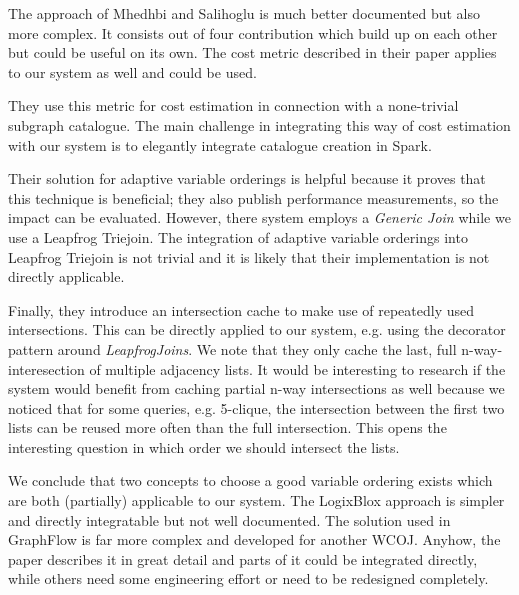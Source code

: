 The approach of Mhedhbi and Salihoglu is much better documented but also more complex.
It consists out of four contribution which build up on each other but could be useful on its own.
The cost metric described in their paper applies to our system as well and could be used.

They use this metric for cost estimation in connection with a none-trivial subgraph catalogue.
The main challenge in integrating this way of cost estimation with our system is to elegantly integrate catalogue creation in Spark.

Their solution for adaptive variable orderings is helpful because it proves that this technique is beneficial;
they also publish performance measurements, so the impact can be evaluated.
However, there system employs a \textit{Generic Join} while we use a Leapfrog Triejoin.
The integration of adaptive variable orderings into Leapfrog Triejoin is not trivial and it is likely that their implementation is not
directly applicable.

Finally, they introduce an intersection cache to make use of repeatedly used intersections.
This can be directly applied to our system, e.g. using the decorator pattern around \textit{LeapfrogJoins}.
We note that they only cache the last, full n-way-interesection of multiple adjacency lists.
It would be interesting to research if the system would benefit from caching partial n-way intersections as well because
we noticed that for some queries, e.g. 5-clique, the intersection between the first two lists can be reused more often than the full
intersection.
This opens the interesting question in which order we should intersect the lists.

We conclude that two concepts to choose a good variable ordering exists which are both (partially) applicable to our system.
The LogixBlox approach is simpler and directly integratable but not well documented.
The solution used in GraphFlow is far more complex and developed for another \textsc{WCOJ}.
Anyhow, the paper describes it in great detail and parts of it could be integrated directly, while others need some engineering effort or
need to be redesigned completely.





